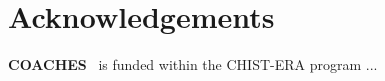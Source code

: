 \documentclass{llncs}
\def\coaches{ {\bf COACHES}}
\begin{document}










\section*{Acknowledgements}

\coaches ~ is funded within the CHIST-ERA program ...

\begin{small}


\end{small}
\end{document}
